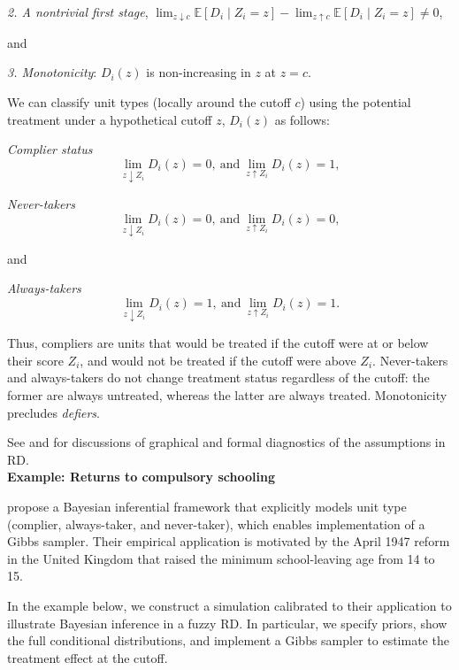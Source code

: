 \textit{2. A nontrivial first stage},
\(\lim_{z \downarrow c}\mathbb{E}[D_i\mid Z_i=z]-\lim_{z \uparrow c}\mathbb{E}[D_i\mid Z_i=z]\neq 0\),

and 

\textit{3. Monotonicity}: \(D_i(z)\) is non-increasing in \(z\) at \(z=c\).

We can classify unit types (locally around the cutoff $c$) using the potential treatment under a hypothetical cutoff $z$, $D_i(z)$ as follows:

\textit{Complier status} \[ \lim_{z\downarrow Z_i}D_i(z)=0, \ \text{and} \ \lim_{z\uparrow Z_i}D_i(z)=1, \]
 
\textit{Never-takers} \[ \lim_{z\downarrow Z_i}D_i(z)=0, \ \text{and} \ \lim_{z\uparrow Z_i}D_i(z)=0, \] 

and
 
\textit{Always-takers} \[ \lim_{z\downarrow Z_i}D_i(z)=1, \ \text{and} \ \lim_{z\uparrow Z_i}D_i(z)=1. \]

Thus, compliers are units that would be treated if the cutoff were at or below their score $Z_i$, and would not be treated if the cutoff were above $Z_i$. Never-takers and always-takers do not change treatment status regardless of the cutoff: the former are always untreated, whereas the latter are always treated. Monotonicity precludes \emph{defiers}.

See \cite{imbens2008regression} and \cite{cattaneo2019practical} for discussions of graphical and formal diagnostics of the assumptions in RD.\\

\textbf{Example: Returns to compulsory schooling \cite{chib2016bayesian}}

\cite{chib2016bayesian} propose a Bayesian inferential framework that explicitly models unit type (complier, always-taker, and never-taker), which enables implementation of a Gibbs sampler. Their empirical application is motivated by the April 1947 reform in the United Kingdom that raised the minimum school-leaving age from 14 to 15.

In the example below, we construct a simulation calibrated to their application to illustrate Bayesian inference in a fuzzy RD. In particular, we specify priors, show the full conditional distributions, and implement a Gibbs sampler to estimate the treatment effect at the cutoff.

